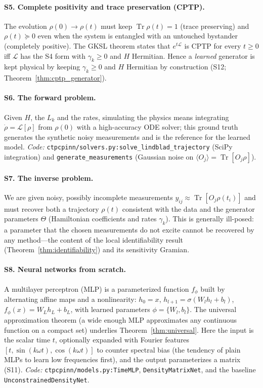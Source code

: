 \documentclass[11pt]{article}
\DeclareMathOperator{\Tr}{Tr}
\newcommand{\calL}{\mathcal{L}}
\begin{document}
\paragraph{S5. Complete positivity and trace preservation (CPTP).}
The evolution $\rho(0)\to\rho(t)$ must keep $\Tr\rho(t)=1$ (trace preserving) and $\rho(t)\succeq0$ even when the system is entangled with an untouched bystander (completely positive). The GKSL theorem states that $e^{t\calL}$ is CPTP for every $t\ge0$ iff $\calL$ has the S4 form with $\gamma_k\ge0$ and $H$ Hermitian. Hence a \emph{learned} generator is kept physical by keeping $\gamma_k\ge0$ and $H$ Hermitian by construction (S12; Theorem~\ref{thm:cptp_generator}).

\paragraph{S6. The forward problem.}
Given $H$, the $L_k$ and the rates, simulating the physics means integrating $\dot\rho=\calL[\rho]$ from $\rho(0)$ with a high-accuracy ODE solver; this ground truth generates the synthetic noisy measurements and is the reference for the learned model. \emph{Code:} \texttt{ctpcpinn/solvers.py:solve\_lindblad\_trajectory} (SciPy integration) and \texttt{generate\_measurements} (Gaussian noise on $\langle O_j\rangle=\Tr[O_j\rho]$).

\paragraph{S7. The inverse problem.}
We are given noisy, possibly incomplete measurements $y_{ij}\approx\Tr[O_j\rho(t_i)]$ and must recover both a trajectory $\rho(t)$ consistent with the data and the generator parameters $\Theta$ (Hamiltonian coefficients and rates $\gamma_k$). This is generally ill-posed: a parameter that the chosen measurements do not excite cannot be recovered by any method---the content of the local identifiability result (Theorem~\ref{thm:identifiability}) and its sensitivity Gramian.

\paragraph{S8. Neural networks from scratch.}
A multilayer perceptron (MLP) is a parameterized function $f_\phi$ built by alternating affine maps and a nonlinearity: $h_0=x$, $h_{l+1}=\sigma(W_l h_l+b_l)$, $f_\phi(x)=W_L h_L+b_L$, with learned parameters $\phi=\{W_l,b_l\}$. The universal approximation theorem (a wide enough MLP approximates any continuous function on a compact set) underlies Theorem~\ref{thm:universal}. Here the input is the scalar time $t$, optionally expanded with Fourier features $[t,\sin(k\omega t),\cos(k\omega t)]$ to counter spectral bias (the tendency of plain MLPs to learn low frequencies first), and the output parameterizes a matrix (S11). \emph{Code:} \texttt{ctpcpinn/models.py:TimeMLP}, \texttt{DensityMatrixNet}, and the baseline \texttt{UnconstrainedDensityNet}.
\end{document}
